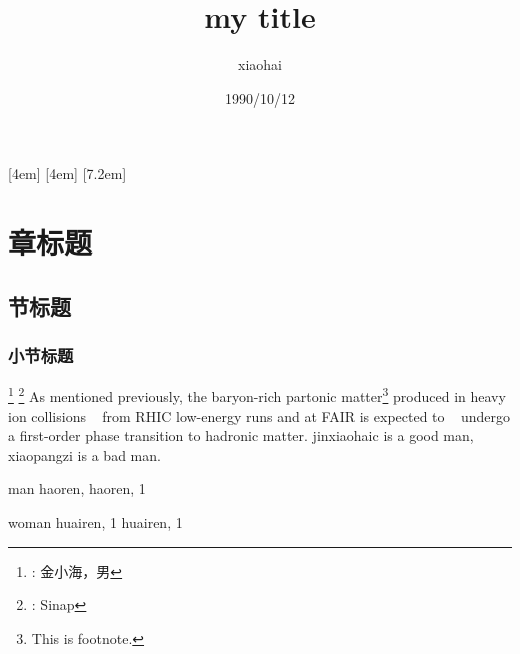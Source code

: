 \documentclass[11pt,UTF8,hyperref,openany]{ctexbook}
\author{xiaohai}
\date{1990/10/12}
\title{my title}
\begin{document}

\maketitle

[4em]{\addvspace{2.3mm}\bf}{%
  \contentslabel{4.0em}}{}{\titlerule*[5pt]{$\cdot$}\contentspage}
[4em]{}{\contentslabel{2.5em}}{}{%
  \titlerule*[5pt]{$\cdot$}\contentspage}
[7.2em]{}{\contentslabel{3.3em}}{}{%
  \titlerule*[5pt]{$\cdot$}\contentspage}
\tableofcontents

\listoffigures
\listoftables

\chapter{章标题}
\section{节标题}
\subsection{小节标题}

\renewcommand{\thefootnote}{}
\footnote{: 金小海，男}
\footnote{: Sinap}
\setcounter{footnote}{0}
\renewcommand{\thefootnote}{\arabic{footnote}}
As mentioned previously, the baryon-rich partonic matter\footnote{This is footnote.}
produced in heavy ion collisions ~\cite{检索名1} from RHIC low-energy runs and at FAIR 
is expected to ~\cite{检索名2} undergo a first-order phase transition to hadronic 
matter. jinxiaohaic is a good man, xiaopangzi 
is a bad man.

\begin{theindex}
\item man
\subitem haoren, 
\subsubitem haoren, 1
\indexspace
\item woman
\subitem huairen, 1
\subsubitem huairen, 1
\end{theindex}
\end{document}
